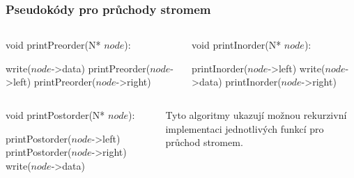 \documentclass[10pt]{beamer}
\begin{document}
\begin{frame}\frametitle{Pseudokódy pro průchody stromem}

    \begin{columns}
        \begin{column}{0.5\textwidth}
            void printPreorder(N* $node$):
            \begin{algorithmic}
                    \STATE write($node$->data)
                    \STATE printPreorder($node$->left)
                    \STATE printPreorder($node$->right)
                \ENDIF
            \end{algorithmic}
        \end{column}
        \begin{column}{0.5\textwidth}
            void printInorder(N* $node$):
            \begin{algorithmic}
                    \STATE printInorder($node$->left)
                    \STATE write($node$->data)
                    \STATE printInorder($node$->right)
                \ENDIF
            \end{algorithmic}
        \end{column}
    \end{columns}

    \vspace{35pt}
    
    \begin{columns}
        \begin{column}{0.5\textwidth}
            void printPostorder(N* $node$):
            \begin{algorithmic}
                    \STATE printPostorder($node$->left)
                    \STATE printPostorder($node$->right)
                    \STATE write($node$->data)
                \ENDIF
            \end{algorithmic}
        \end{column}
        \begin{column}{0.5\textwidth}
            \begin{block}{}
                Tyto algoritmy ukazují možnou rekurzivní implementaci jednotlivých funkcí pro průchod stromem.
            \end{block}
        \end{column}
    \end{columns}

\end{frame}
\end{document}

